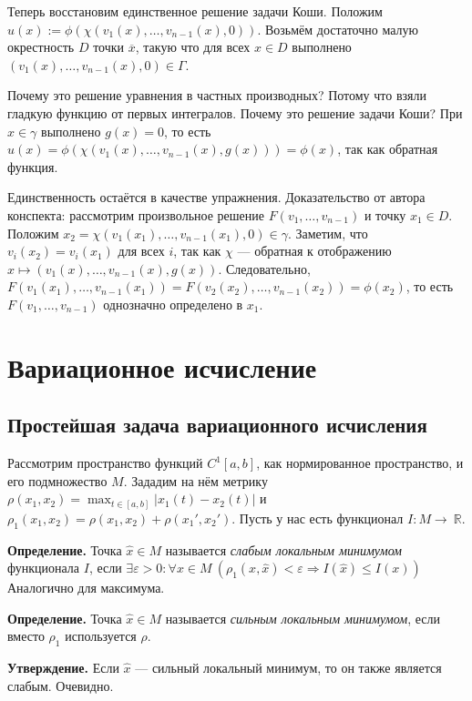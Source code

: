 Теперь восстановим единственное решение задачи Коши.
Положим $u(x) := \phi(\chi(v_1(x), \dots, v_{n-1}(x), 0))$.
Возьмём достаточно малую окрестность $D$ точки $\overline x$, такую что для всех $x \in D$ выполнено $(v_1(x), \dots, v_{n-1}(x), 0) \in \Gamma$.

Почему это решение уравнения в частных производных? Потому что взяли гладкую функцию от первых интегралов.
\sloppy Почему это решение задачи Коши? При $x \in \gamma$ выполнено $g(x) = 0$, то есть $u(x) = \phi(\chi(v_1(x), \dots, v_{n-1}(x), g(x))) = \phi(x)$, так как обратная функция.

Единственность остаётся в качестве упражнения.
Доказательство от автора конспекта: рассмотрим произвольное решение $F(v_1, \dots, v_{n-1})$ и точку $x_1 \in D$.
Положим $x_2 = \chi(v_1(x_1), \dots, v_{n-1}(x_1), 0) \in \gamma$.
Заметим, что $v_i(x_2) = v_i(x_1)$ для всех $i$, так как $\chi$ --- обратная к отображению $x \mapsto (v_1(x), \dots, v_{n-1}(x), g(x))$.
Следовательно, $F(v_1(x_1), \dots, v_{n-1}(x_1)) = F(v_2(x_2), \dots, v_{n-1}(x_2)) = \phi(x_2)$, то есть $F(v_1, \dots, v_{n-1})$ однозначно определено в $x_1$.

\QED

\section{Вариационное исчисление}
\subsection{Простейшая задача вариационного исчисления}
Рассмотрим пространство функций $C^1[a, b]$, как нормированное пространство, и его подмножество $M$.
Зададим на нём метрику $\rho(x_1, x_2) = \max_{t \in [a, b]} |x_1(t) - x_2(t)|$ и $\rho_1(x_1, x_2) = \rho(x_1, x_2) + \rho(x_1', x_2')$.
Пусть у нас есть функционал $I: M \to\ \mathbb R$.

\textbf{Определение.} Точка $\widehat x \in M$ называется \textit{слабым локальным минимумом} функционала $I$, если $\exists \varepsilon > 0: \forall x \in M~(\rho_1(x, \widehat x) < \varepsilon \Rightarrow I(\widehat x) \le I(x))$
Аналогично для максимума.

\textbf{Определение.} Точка $\widehat x \in M$ называется \textit{сильным локальным минимумом}, если вместо $\rho_1$ используется $\rho$.

\textbf{Утверждение.} Если $\widehat x$ --- сильный локальный минимум, то он также является слабым. Очевидно.

